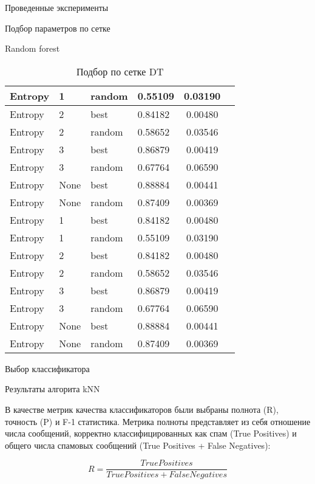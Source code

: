 \begin{section}{Проведенные эксперименты}
\begin{subsection}{Подбор параметров по сетке}
\begin{subsubsection}{Random forest}
\begin{table}[H]
{\begin{tabular}{|l|l|l|l|c|c|}
  \hline
  Entropy & 1  & random & 0.55109 & 0.03190 \\
  \hline
  Entropy  & 2  & best & 0.84182 & 0.00480 \\
  \hline
  Entropy  &  2 & random  & 0.58652 & 0.03546 \\
  \hline
  Entropy  & 3  & best &  0.86879 & 0.00419 \\
  \hline
  Entropy  & 3  & random & 0.67764 & 0.06590 \\
  \hline
  Entropy & None  & best & 0.88884 & 0.00441 \\
  \hline
  Entropy &  None & random  & 0.87409 & 0.00369 \\
  \hline
  Entropy & 1  & best & 0.84182 & 0.00480 \\
  \hline
  Entropy & 1  & random & 0.55109 & 0.03190 \\
  \hline
  Entropy  & 2  & best & 0.84182 & 0.00480 \\
  \hline
  Entropy  &  2 & random  & 0.58652 & 0.03546 \\
  \hline
  Entropy  & 3  & best &  0.86879 & 0.00419 \\
  \hline
  Entropy  & 3  & random & 0.67764 & 0.06590 \\
  \hline
  Entropy & None  & best & 0.88884 & 0.00441 \\
  \hline
  Entropy &  None & random  & 0.87409 & 0.00369 \\
  \hline
  \end{tabular}}

  \caption{Подбор по сетке DT}
  \label{grid:dt}
  \end{table}



\end{subsubsection}

\end{subsection}

\begin{subsection}{Выбор классификатора}

Результаты алгорита kNN


В качестве метрик качества классификаторов были выбраны полнота (R), точность (P) и F-1 статистика. Метрика полноты представляет из себя отношение числа сообщений, корректно классифицированных как спам (True Positives) и общего числа спамовых сообщений (True Positives + False Negatives):

\begin{equation}
  R = \frac{True Positives}{True Positives + False Negatives}
\end{equation}


\end{subsection}
\end{section}
